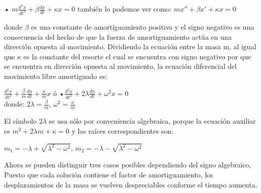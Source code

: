 \documentclass[12pt,a4paper]{article}
\begin{document}
 \vspace{0.3cm}
 
• 
$m{\frac{d^2x}{dt^2}} + \beta{\frac{dx}{dt} + \kappa x  =0} $\hspace{0.6cm}  también lo podemos ver como: {\hspace{1cm} $mx'' + \beta x' + \kappa x = 0 $\\}


donde $\beta$ es una constante de amortiguamiento positiva y el signo negativo es una consecuencia del hecho de que la fuerza de amortiguamiento actúa en una dirección
opuesta al movimiento.
Dividiendo la ecuación  entre la masa m, al igual que $\kappa$ es la constante del resorte el cual se encuentra con signo negativo por que se encuentra en dirección opuesta al movimiento, la ecuación diferencial del movimiento libre amortiguado es:


\vspace{0.6cm}
${\frac{d^2x}{dt^2}} + {\frac{\beta}{m}{\frac{dx}{dt}}} +{\frac{\kappa}{m}x} $   \hspace{0.8cm} ó  \hspace{0.8cm} \vspace{0.7cm} •${\frac{d^2x}{dt^2}} + 2\lambda{\frac{dx}{dt} + \omega^{2} x  =0} $\\  



donde: \hspace{0.8cm}
$2\lambda={\frac{\beta}{m}}$, \hspace{0.8cm} $\omega^{2}={\frac{\kappa}{m}}$
\vspace{1cm}


El símbolo $2\lambda$ se usa sólo por conveniencia algebraica, porque la ecuación auxiliar es
$m^{2} + 2\lambda m + \kappa = 0 $ y las raíces correspondientes son:
\vspace{0.6cm}
\begin{center}

$m_{1} = -\lambda + \sqrt{\lambda^{2}-\omega^{2}}$,\hspace{0.8cm}   $m_{2} = -\lambda - \sqrt{\lambda^{2}-\omega^{2}}$
\end{center}

\vspace{1cm}


Ahora se pueden distinguir tres casos posibles dependiendo del signo algebraico, Puesto que cada solución contiene el factor de amortiguamiento, los desplazamientos de la masa se vuelven despreciables conforme el tiempo aumenta.
\end{document}
